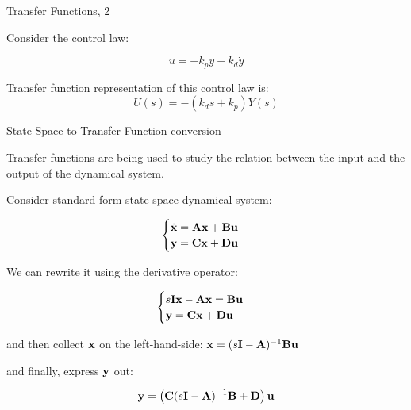 \documentclass{beamer}
\begin{document}
\begin{frame}{Transfer Functions, 2}
	\begin{flushleft}
		
		Consider the control law:
		
		\begin{equation}
			u = -k_p y - k_d \dot y
		\end{equation}
		
		Transfer function representation of this control law is:
		\begin{equation}
			U(s) = -(k_d s + k_p) Y(s)
		\end{equation}
		
	\end{flushleft}
\end{frame}




\begin{frame}{State-Space to Transfer Function conversion}
\begin{flushleft}

Transfer functions are being used to study the relation between the input and the output of the dynamical system.

\bigskip

Consider standard form state-space dynamical system:

\begin{equation}
\begin{cases}
\dot{\mathbf{x}} = \mathbf{A}\mathbf{x} + \mathbf{B}\mathbf{u} \\
     \mathbf{y}  = \mathbf{C}\mathbf{x} + \mathbf{D}\mathbf{u}
\end{cases}
\end{equation}

We can rewrite it using the derivative operator:

\begin{equation}
\begin{cases}
s\mathbf{I}\mathbf{x} -\mathbf{A}\mathbf{x} = \mathbf{B}\mathbf{u} \\
\mathbf{y}  = \mathbf{C}\mathbf{x} + \mathbf{D}\mathbf{u}
\end{cases}
\end{equation}

and then collect $\mathbf{x}$ on the left-hand-side: $\mathbf{x} = (s\mathbf{I} -\mathbf{A})^{-1} \mathbf{B}\mathbf{u}$

and finally, express $\mathbf{y}$ out:

\begin{equation}
\mathbf{y}  = \left( \mathbf{C}(s\mathbf{I} -\mathbf{A})^{-1} \mathbf{B} + \mathbf{D} \right) \mathbf{u}
\end{equation}

\end{flushleft}
\end{frame}
\end{document}
